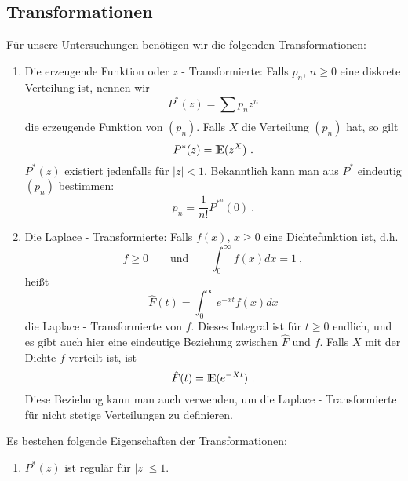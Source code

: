 \begin{appendix}
\chapter{Transformationen}
Für unsere Untersuchungen benötigen wir die folgenden Transformationen:
\begin{enumerate}
\item Die erzeugende Funktion oder $z$ - Transformierte: Falls $p_{n}$, $n
\geq 0$ eine diskrete Verteilung ist, nennen wir
\begin{displaymath}
P^{*}(z) = \sum_{}^{} p_{n} z^{n}
\end{displaymath}
die erzeugende Funktion von $(p_{n})$. Falls $X$ die Verteilung $(p_{n})$
hat, so gilt
\begin{displaymath}
P^{*}(z) = {\rm I\kern-0.2em E} (z^{X}) ~.
\end{displaymath}
$P^{*}(z)$ existiert jedenfalls für $|z|<1$. Bekanntlich kann man aus
$P^{*}$ eindeutig $(p_{n})$ bestimmen:
\begin{displaymath}
p_{n} = \frac{1}{n!} P^{*^{n}} (0) ~.
\end{displaymath}
\item Die Laplace - Transformierte: Falls $f(x)$, $x \geq 0$ eine
Dichtefunktion ist, d.h.
\begin{displaymath}
f \geq 0 \qquad \mbox{und} \qquad \int_{0}^{\infty} f(x)dx = 1 ~,
\end{displaymath}
heißt
\begin{displaymath}
\hat F(t) = \int_{0}^{\infty} e^{-xt} f(x)dx
\end{displaymath}
die Laplace - Transformierte von $f$. Dieses Integral ist für $t \geq 0$
endlich, und es gibt auch hier eine eindeutige Beziehung zwischen $\hat F$
und $f$. Falls $X$ mit der Dichte $f$ verteilt ist, ist
\begin{displaymath}
\hat F(t) = {\rm I\kern-0.2em E} (e^{-Xt}) ~.
\end{displaymath}
Diese Beziehung kann man auch verwenden, um die Laplace - Transformierte
für nicht stetige Verteilungen zu definieren.
\end{enumerate}
Es bestehen folgende Eigenschaften der Transformationen:
\begin{enumerate}
\item $P^{*}(z)$ ist regulär für $|z| \leq 1$.

\end{enumerate}
\end{appendix}
